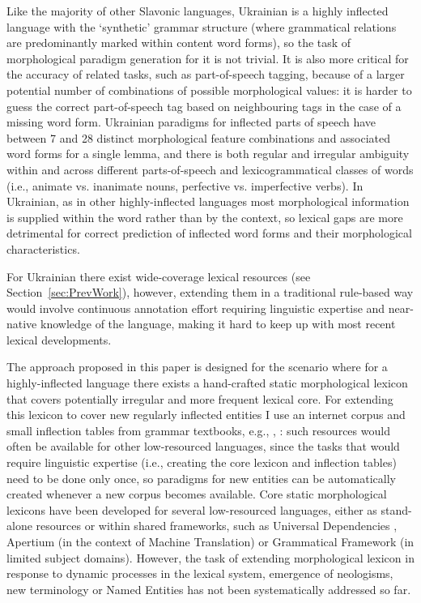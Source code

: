 \documentclass[11pt,a4paper]{article}
\begin{document}
Like the majority of other Slavonic languages, Ukrainian is a highly inflected language with the `synthetic' grammar structure (where grammatical relations are predominantly marked within content word forms), so the task of morphological paradigm generation for it is not trivial. It is also more critical for the accuracy of related tasks, such as part-of-speech tagging, because of a larger potential number of combinations of possible morphological values: it is harder to guess the correct part-of-speech tag based on neighbouring tags in the case of a missing word form. Ukrainian paradigms for inflected parts of speech have between 7 and 28 distinct morphological feature combinations and associated word forms for a single lemma, and there is both regular and irregular ambiguity within and across different parts-of-speech and lexicogrammatical classes of words (i.e., animate vs. inanimate nouns, perfective vs. imperfective verbs). In Ukrainian, as in other highly-inflected languages most morphological information is supplied within the word rather than by the context, so lexical gaps are more detrimental for correct prediction of inflected word forms and their morphological characteristics.

For Ukrainian there exist wide-coverage lexical resources (see Section~\ref{sec:PrevWork}), however, extending them in a traditional rule-based way would involve continuous annotation effort requiring linguistic expertise and near-native knowledge of the language, making it hard to keep up with most recent lexical developments. 

The approach proposed in this paper is designed for the scenario where for a highly-inflected language there exists a hand-crafted static morphological lexicon that covers potentially irregular and more frequent lexical core. For extending this lexicon to cover new regularly inflected entities I use an internet corpus and small inflection tables from grammar textbooks, e.g., \cite{hryshchenko1997sulm}, \cite{press2015ukrainian}: such resources would often be available for other low-resourced languages, since the tasks that would require linguistic expertise (i.e., creating the core lexicon and inflection tables) need to be done only once, so paradigms for new entities can be automatically created whenever a new corpus becomes available. Core static morphological lexicons have been developed for several low-resourced languages, either as stand-alone resources or within shared frameworks, such as Universal Dependencies \cite{nivre2016universal}, Apertium \cite{forcada2011apertium} (in the context of Machine Translation) or Grammatical Framework \cite{ranta11gram} (in limited subject domains). However, the task of extending morphological lexicon in response to dynamic processes in the lexical system, emergence of neologisms, new terminology or Named Entities has not been systematically addressed so far.
\end{document}
